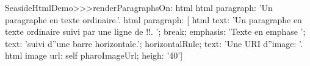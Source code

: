 \begin{code}{}
SeasideHtmlDemo>>>renderParagraphsOn: html 
	html paragraph: 'Un paragraphe en texte ordinaire.'.
	html paragraph: [
		html
			text: 'Un paragraphe en texte ordinaire suivi par une ligne de !!. ';
			break;
			emphasis: 'Texte en emphase ';
			text: 'suivi d''une barre horizontale.';
			horizontalRule;
			text: 'Une URI d''image: '.
		html image
			url: self pharoImageUrl;
			heigh: '40']
\end{code}

